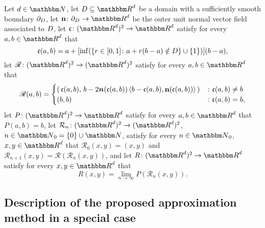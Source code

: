 \label{subsec:temp-discret}
\begin{algo}
	\label{algo:time_discrete_reflected_processes}
	Let
	$d \in \N$, %
	let
	$\D \subseteq \R^{ d }$
	be a domain with a sufficiently smooth boundary
	$\partial_D$,
	let
	$ {\textbf n} \colon \partial_\D \to \R^d $ be the outer unit normal vector field associated to $D$,
	let $\mathfrak{c} \colon (\R^d)^2  \to \R^d $ satisfy for every
	$a,b \in \R^d$
	that
	\begin{equation}
			\mathfrak{c}(a,b) = a + [\inf( \{r \in [0,1] \colon a + r(b - a) \notin D\}\cup \{1\}) ] (b-a),
	\end{equation}
	let
	$\mathscr{R} \colon (\R^{ d })^2 \to ( \R^{ d })^2 $
	satisfy for every
	$a,b \in \R^d$
	that
	\begin{equation}
			\mathscr{R}(a,b) = \begin{cases}
			( \, \mathfrak{c}(a,b), \, b - 2\boldsymbol{n}(\mathfrak{c}(a,b)) \left< b-\mathfrak{c}(a,b),{\textbf n}(\mathfrak{c}(a,b))\right> \,) & \colon \mathfrak{c}(a,b) \neq b \\
			(b,b) & \colon \mathfrak{c}(a,b) = b,
									\end{cases}
	\end{equation}
	let
	$P \colon (\R^d)^2 \to \R^d$
	satisfy for every
	$a,b \in \R^d$
	that
	$P(a,b) = b$,
	let
	$\mathcal{R}_{n} \colon (\R^d)^2 \to ( \R^{ d } )^2$, $n \in \N_0 = \{0\} \cup \N$,
	satisfy for every
	$n \in \N_0 $,
	$x,y \in \R^d$
	that
	$\mathcal{R}_0(x,y) = (x,y)$
	and
	$\mathcal{R}_{ n + 1 }(x,y) = \mathscr{R}( \mathcal{R}_{n} (x,y ) ) $,
	and let
	$R \colon (\R^d)^2 \to \R^d $
	satisfy for every
	$x,y\in \R^d$
	that
	\begin{equation}
		R(x,y)= {\textstyle \lim_{n\to \infty}} P(\mathcal{R}_{n}(x,y)).
	\end{equation}
\end{algo}


\subsection{Description of the proposed approximation method in a special case}

